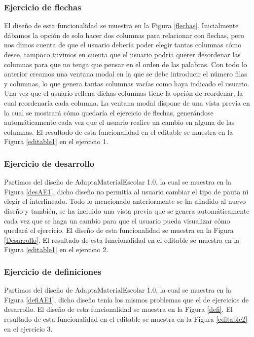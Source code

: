 \subsubsection{Ejercicio de flechas}
El diseño de esta funcionalidad se muestra en la Figura \ref{flechas}. Inicialmente dábamos la opción de solo hacer dos columnas para relacionar con flechas, pero nos dimos cuenta de que el usuario debería poder elegir tantas columnas cómo desee, tampoco tuvimos en cuenta que el usuario podría querer desordenar las columnas para que no tenga que pensar en el orden de las palabras. Con todo lo anterior creamos una ventana modal en la que se debe introducir el número filas y columnas, lo que genera tantas columnas vacías como haya indicado el usuario. Una vez que el usuario rellena dichas columnas tiene la opción de reordenar, la cual reordenaría cada columna. La ventana modal dispone de una vista previa en la cual se mostrará cómo quedaría el ejercicio de flechas, generándose automáticamente cada vez que el usuario realice un cambio en alguna de las columnas. El resultado de esta funcionalidad en el editable se muestra en la Figura \ref{editable1} en el ejercicio 1.

\subsubsection{Ejercicio de desarrollo}
Partimos del diseño de AdaptaMaterialEscolar 1.0, la cual se muestra en la Figura \ref{desAE1}, dicho diseño no permitía al usuario cambiar el tipo de pauta ni elegir el interlineado. Todo lo mencionado anteriormente se ha añadido al nuevo diseño y también, se ha incluido una vista previa que se genera automáticamente cada vez que se haga un cambio para que el usuario pueda visualizar cómo quedará el ejercicio. El diseño de esta funcionalidad se muestra en la Figura \ref{Desarrollo}. El resultado de esta funcionalidad en el editable se muestra en la Figura \ref{editable1} en el ejercicio 2.

\subsubsection{Ejercicio de definiciones}
Partimos del diseño de AdaptaMaterialEscolar 1.0, la cual se muestra en la Figura \ref{defiAE1}, dicho diseño tenía los mismos problemas que el de ejercicios de desarrollo. El diseño de esta funcionalidad se muestra en la Figura \ref{defi}. El resultado de esta funcionalidad en el editable se muestra en la Figura \ref{editable2} en el ejercicio 3.

